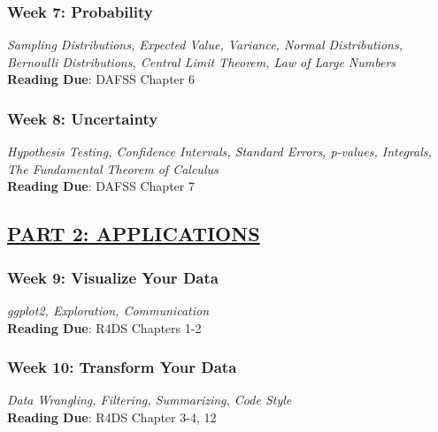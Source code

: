 \documentclass[11pt, letterpaper]{article}
\begin{document}


\subsubsection*{Week 7: Probability}
\textit{Sampling Distributions, Expected Value, Variance, Normal Distributions, Bernoulli Distributions, Central Limit Theorem, Law of Large Numbers}\\
\textbf{Reading Due}: DAFSS Chapter 6

\subsubsection*{Week 8: Uncertainty}
\textit{Hypothesis Testing, Confidence Intervals, Standard Errors, p-values,  Integrals, The Fundamental Theorem of Calculus}\\
\textbf{Reading Due}: DAFSS Chapter 7


\subsection*{\underline{PART 2: APPLICATIONS}}

\subsubsection*{Week 9: Visualize Your Data}
\textit{ggplot2, Exploration, Communication}\\
\textbf{Reading Due}: R4DS Chapters 1-2

\subsubsection*{Week 10: Transform Your Data}
\textit{Data Wrangling, Filtering, Summarizing, Code Style}\\
\textbf{Reading Due}: R4DS Chapter 3-4, 12
\end{document}
